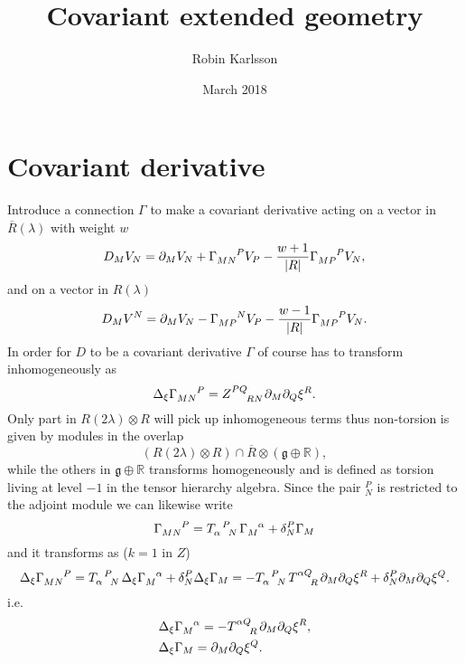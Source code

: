 \documentclass{article}
\title{Covariant extended geometry}
\author{Robin Karlsson}
\date{March 2018}
\begin{document}

\section{Covariant derivative}
Introduce a connection $\Gamma$ to make a covariant derivative acting on a vector in $\overbar{R}(\lambda)$ with weight $w$
\begin{equation}
    D_M V_N = \pd_MV_N +\tensor{\Gamma}{_M_N^P}V_P-\frac{w+1}{|R|}\tensor{\Gamma}{_M_P^P}V_N,
\end{equation}
and on a vector in $R(\lambda)$
\begin{equation}
    D_M V^N = \pd_MV_N-\tensor{\Gamma}{_M_P^N}V_P-\frac{w-1}{|R|}\tensor{\Gamma}{_M_P^P}V_N.
\end{equation}
In order for $D$ to be a covariant derivative $\Gamma$ of course has to transform inhomogeneously as 
\begin{equation}
    \Delta_\xi \tensor{\Gamma}{_M_N^P}=\tensor{Z}{^{PQ}_{RN}}\pd_M\pd_Q\xi^R. 
\end{equation}
Only part in $R(2\lambda)\otimes R$ will pick up inhomogeneous terms thus non-torsion is given by modules in the overlap 
\begin{equation}
    \left(R(2\lambda)\otimes R\right)\cap \overbar{R}\otimes \left(\mathfrak{g}\oplus\mathbb{R}\right),
\end{equation}
while the others in $\mathfrak{g}\oplus\mathbb{R}$ transforms homogeneously and is defined as torsion living at level $-1$ in the tensor hierarchy algebra. Since the pair $_N^P$ is restricted to the adjoint module we can likewise write 
\begin{equation}
    \tensor{\Gamma}{_{MN}^P} = \tensor{T}{_\alpha^P_N}\tensor{\Gamma}{_{M}^\alpha}+\delta^P_N\Gamma_M
\end{equation}
and it transforms as ($k=1$ in $Z$)
\begin{equation}
    \Delta_\xi \tensor{\Gamma}{_{MN}^P}= \tensor{T}{_\alpha^P_N}\Delta_\xi\tensor{\Gamma}{_{M}^\alpha}+\delta^P_N\Delta_\xi\Gamma_M = -\tensor{T}{_\alpha^P_N}\tensor{T}{^\alpha^Q_R}\pd_M\pd_Q\xi^R+\delta^P_N\pd_M\pd_Q\xi^Q.
\end{equation}
i.e.
\begin{align*}
    &\Delta_\xi\tensor{\Gamma}{_{M}^\alpha}=-\tensor{T}{^\alpha^Q_R}\pd_M\pd_Q\xi^R,\\
    &\Delta_\xi\Gamma_M = \pd_M\pd_Q\xi^Q.
\end{align*}
\end{document}
